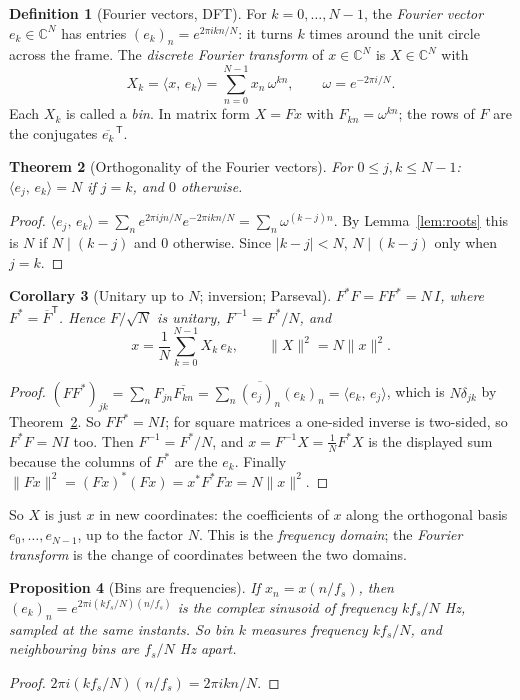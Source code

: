 \documentclass[11pt]{article}
\newtheorem{theorem}{Theorem}[section]
\newtheorem{proposition}[theorem]{Proposition}
\newtheorem{corollary}[theorem]{Corollary}
\theoremstyle{definition}
\newtheorem{definition}[theorem]{Definition}
\newcommand{\C}{\mathbb{C}}
\newcommand{\ip}[2]{\langle #1,\, #2\rangle}
\newcommand{\norm}[1]{\lVert #1\rVert}
\newcommand{\abs}[1]{\lvert #1\rvert}
\begin{document}
\begin{definition}[Fourier vectors, DFT]
For $k=0,\dots,N-1$, the \emph{Fourier vector} $e_k\in\C^N$ has entries
$(e_k)_n=e^{2\pi ikn/N}$: it turns $k$ times around the unit circle across the
frame. The \emph{discrete Fourier transform} of $x\in\C^N$ is $X\in\C^N$ with
\[
X_k=\ip{x}{e_k}=\sum_{n=0}^{N-1}x_n\,\omega^{kn},\qquad\omega=e^{-2\pi i/N}.
\]
Each $X_k$ is called a \emph{bin}. In matrix form $X=Fx$ with $F_{kn}=\omega^{kn}$; the
rows of $F$ are the conjugates $\overline{e_k}^{\,\mathsf T}$.
\end{definition}

\begin{theorem}[Orthogonality of the Fourier vectors]\label{thm:orth}
For $0\le j,k\le N-1$: $\ip{e_j}{e_k}=N$ if $j=k$, and $0$ otherwise.
\end{theorem}
\begin{proof}
$\ip{e_j}{e_k}=\sum_ne^{2\pi ijn/N}e^{-2\pi ikn/N}=\sum_n\omega^{(k-j)n}$. By
Lemma~\ref{lem:roots} this is $N$ if $N\mid(k-j)$ and $0$ otherwise. Since
$\abs{k-j}<N$, $N\mid(k-j)$ only when $j=k$.
\end{proof}

\begin{corollary}[Unitary up to $N$; inversion; Parseval]\label{cor:unitary}
$F^*F=FF^*=N\,I$, where $F^*=\overline F^{\mathsf T}$. Hence $F/\sqrt N$ is unitary,
$F^{-1}=F^*/N$, and
\[
x=\frac1N\sum_{k=0}^{N-1}X_k\,e_k,\qquad\norm{X}^2=N\norm{x}^2.
\]
\end{corollary}
\begin{proof}
$(FF^*)_{jk}=\sum_nF_{jn}\overline{F_{kn}}=\sum_n\overline{(e_j)_n}(e_k)_n
=\ip{e_k}{e_j}$, which is $N\delta_{jk}$ by Theorem~\ref{thm:orth}. So $FF^*=NI$; for
square matrices a one-sided inverse is two-sided, so $F^*F=NI$ too. Then
$F^{-1}=F^*/N$, and $x=F^{-1}X=\frac1NF^*X$ is the displayed sum because the columns
of $F^*$ are the $e_k$. Finally $\norm{Fx}^2=(Fx)^*(Fx)=x^*F^*Fx=N\norm x^2$.
\end{proof}

So $X$ is just $x$ in new coordinates: the coefficients of $x$ along the orthogonal
basis $e_0,\dots,e_{N-1}$, up to the factor $N$. This is the \emph{frequency domain};
the \emph{Fourier transform} is the change of coordinates between the two domains.

\begin{proposition}[Bins are frequencies]
If $x_n=x(n/f_s)$, then $(e_k)_n=e^{2\pi i(kf_s/N)(n/f_s)}$ is the complex sinusoid of
frequency $kf_s/N$ Hz, sampled at the same instants. So bin $k$ measures frequency
$kf_s/N$, and neighbouring bins are $f_s/N$ Hz apart.
\end{proposition}
\begin{proof}
$2\pi i(kf_s/N)(n/f_s)=2\pi ikn/N$.
\end{proof}
\end{document}
